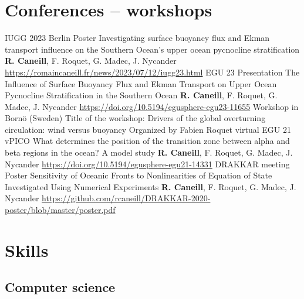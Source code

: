 \documentclass[11pt,a4paper,roman]{moderncv}
\begin{document}
\nocite{*}



\section{Conferences -- workshops}
        {IUGG 2023 Berlin}
        {Poster}
        {Investigating surface buoyancy flux and Ekman transport influence on the Southern Ocean's upper ocean pycnocline stratification}
        {\textbf{R. Caneill}, F. Roquet, G. Madec, J. Nycander}
        {\href{https://romaincaneill.fr/news/2023/07/12/iugg23.html}{https://romaincaneill.fr/news/2023/07/12/iugg23.html}}
        {EGU 23}
        {Presentation}
        {The Influence of Surface Buoyancy Flux and Ekman Transport on Upper Ocean Pycnocline Stratification in the Southern Ocean}
        {\textbf{R. Caneill}, F. Roquet, G. Madec, J. Nycander}
        {\href{https://doi.org/10.5194/egusphere-egu23-11655}{https://doi.org/10.5194/egusphere-egu23-11655}}
        {Workshop in Bornö (Sweden)}
        {Title of the workshop:
        Drivers of the global overturning circulation: wind versus buoyancy}
        {Organized by Fabien Roquet}
        {}{}
        {virtual EGU 21}
        {vPICO}
        {What determines the position of the transition zone between alpha and beta regions in the ocean? A model study}
        {\textbf{R. Caneill}, F. Roquet, G. Madec, J. Nycander}
        {\href{https://doi.org/10.5194/egusphere-egu21-14331}{https://doi.org/10.5194/egusphere-egu21-14331}}
        {DRAKKAR meeting}
        {Poster}
        {Sensitivity of Oceanic Fronts to Nonlinearities of Equation of State Investigated Using Numerical Experiments}
        {\textbf{R. Caneill}, F. Roquet, G. Madec, J. Nycander}
        {\href{https://github.com/rcaneill/DRAKKAR-2020-poster/blob/master/poster.pdf}{https://github.com/rcaneill/DRAKKAR-2020-poster/blob/master/poster.pdf}}

\section{Skills}


\subsection{Computer science}
\end{document}

